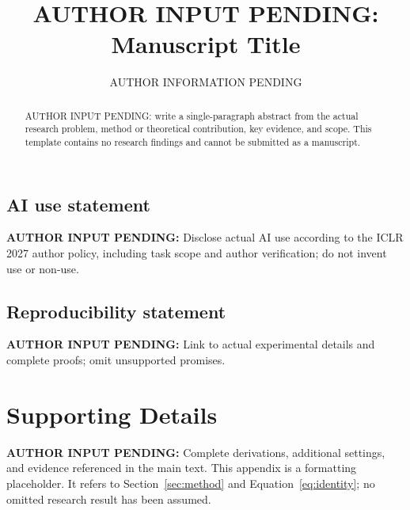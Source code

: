 \documentclass{article}\usepackage{iclr2027_conference,times}
\title{AUTHOR INPUT PENDING: Manuscript Title}\author{AUTHOR INFORMATION PENDING}
\newcommand{\AuthorPending}[1]{\textbf{AUTHOR INPUT PENDING:} #1}
\begin{document}
\maketitle
\begin{abstract}
AUTHOR INPUT PENDING: write a single-paragraph abstract from the actual research problem,
method or theoretical contribution, key evidence, and scope. This template contains
no research findings and cannot be submitted as a manuscript.
\end{abstract}

\subsection*{AI use statement}\AuthorPending{Disclose actual AI use according to the ICLR 2027 author policy, including task scope and author verification; do not invent use or non-use.}
\subsection*{Reproducibility statement}\AuthorPending{Link to actual experimental details and complete proofs; omit unsupported promises.}

\clearpage
\appendix
\section{Supporting Details}
\label{app:supporting}
\AuthorPending{Complete derivations, additional settings, and evidence referenced in the main text.}
This appendix is a formatting placeholder. It refers to Section~\ref{sec:method} and
Equation~\ref{eq:identity}; no omitted research result has been assumed.
\end{document}
